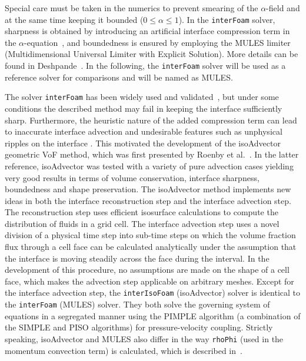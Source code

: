 \documentclass[review]{elsarticle}
\begin{document}
Special care must be taken in the numerics to prevent smearing of the $\alpha$-field and at the same time keeping it bounded ($0\leq \alpha\leq 1$). In the \verb+interFoam+ solver, sharpness is obtained by introducing an artificial interface compression term in the $\alpha$-equation~\cite{Weller2008}, and boundedness is ensured by employing the MULES limiter (Multidimensional Universal Limiter with Explicit Solution). More details can be found in Deshpande~\cite{Deshpande2012}. In the following, the  \verb+interFoam+ solver will be used as a reference solver for comparisons and will be named as MULES.

The solver \verb+interFoam+ has been widely used and validated~\cite{MARSCHALL2012,RAEINI2012,HOANG2013,BILGER2017}, but under some conditions the described method may fail in keeping the interface sufficiently sharp. Furthermore, the heuristic nature of the added compression term can lead to inaccurate interface advection and undesirable features such as unphysical ripples on the interface \cite{roenby_new_2017,roenby_isoadvector:_2018}. This motivated the development of the isoAdvector geometric VoF method, which was first presented by Roenby et al.~\cite{Roenby160405}. In the latter reference, isoAdvector was tested with a variety of pure advection cases yielding very good results in terms of volume conservation, interface sharpness, boundedness and shape preservation.
The isoAdvector method implements new ideas in both the interface reconstruction step and the interface advection step. The reconstruction step uses efficient isosurface calculations to compute the distribution of fluids in a grid cell. The interface advection step uses a novel division of a physical time step into sub-time steps on which the volume fraction flux through a  cell face can be calculated analytically under the assumption that the interface is moving steadily across the face during the interval. In the development of this procedure, no assumptions are made on the shape of a cell face, which makes the advection step applicable on arbitrary meshes.
Except for the interface advection step, the \verb+interIsoFoam+ (isoAdvector) solver is identical to the \verb+interFoam+ (MULES) solver. They both solve the governing system of equations in a segregated manner using the PIMPLE algorithm (a combination of the SIMPLE and PISO algorithms) for pressure-velocity coupling. Strictly speaking, isoAdvector and MULES also differ in the way \verb+rhoPhi+ (used in the momentum convection term) is calculated, which is described in~\cite{roenby_isoadvector:_2018}.
 
\end{document}
